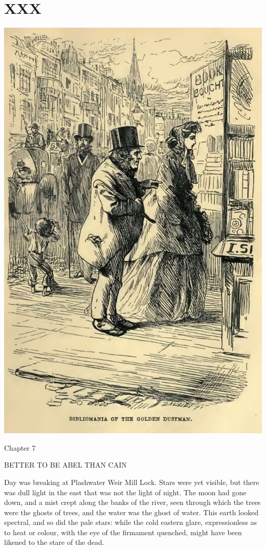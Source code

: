 
\chapter{XXX}

\includegraphics[scale=2.3]{03-05-01}

Chapter 7

BETTER TO BE ABEL THAN CAIN


Day was breaking at Plashwater Weir Mill Lock. Stars were yet visible,
but there was dull light in the east that was not the light of night.
The moon had gone down, and a mist crept along the banks of the river,
seen through which the trees were the ghosts of trees, and the water
was the ghost of water. This earth looked spectral, and so did the
pale stars: while the cold eastern glare, expressionless as to heat or
colour, with the eye of the firmament quenched, might have been likened
to the stare of the dead.

